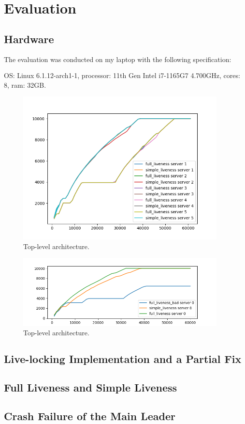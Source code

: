 \documentclass[11pt]{article}
\begin{document}
\section*{Evaluation}
\subsection*{Hardware}
The evaluation was conducted on my laptop with the following specification:

OS: Linux 6.1.12-arch1-1, processor: 11th Gen Intel i7-1165G7 4.700GHz, cores: 8, ram: 32GB.

\begin{figure}[H]
    \centering
    \includegraphics[width=400px]{full_liveness_vs_simple.png}
    \caption{Top-level architecture.}
    \vspace{-15pt}
\end{figure}

\begin{figure}[H]
    \centering
    \includegraphics[width=400px]{liveness_simple_bad_config.png}
    \caption{Top-level architecture.}
    \vspace{-15pt}
\end{figure}

\subsection*{Live-locking Implementation and a Partial Fix}
\subsection*{Full Liveness and Simple Liveness}
\subsection*{Crash Failure of the Main Leader}
\end{document}
